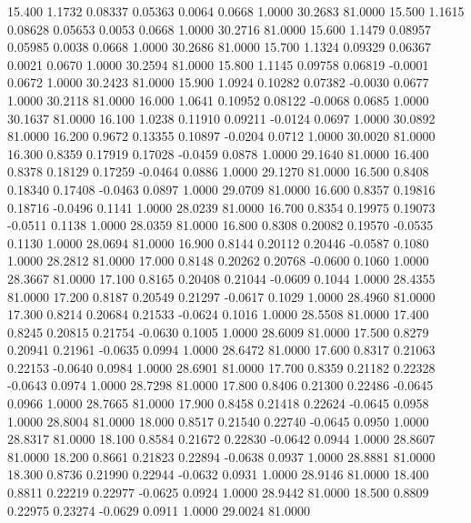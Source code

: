   15.400   1.1732   0.08337   0.05363   0.0064   0.0668   1.0000  30.2683  81.0000
  15.500   1.1615   0.08628   0.05653   0.0053   0.0668   1.0000  30.2716  81.0000
  15.600   1.1479   0.08957   0.05985   0.0038   0.0668   1.0000  30.2686  81.0000
  15.700   1.1324   0.09329   0.06367   0.0021   0.0670   1.0000  30.2594  81.0000
  15.800   1.1145   0.09758   0.06819  -0.0001   0.0672   1.0000  30.2423  81.0000
  15.900   1.0924   0.10282   0.07382  -0.0030   0.0677   1.0000  30.2118  81.0000
  16.000   1.0641   0.10952   0.08122  -0.0068   0.0685   1.0000  30.1637  81.0000
  16.100   1.0238   0.11910   0.09211  -0.0124   0.0697   1.0000  30.0892  81.0000
  16.200   0.9672   0.13355   0.10897  -0.0204   0.0712   1.0000  30.0020  81.0000
  16.300   0.8359   0.17919   0.17028  -0.0459   0.0878   1.0000  29.1640  81.0000
  16.400   0.8378   0.18129   0.17259  -0.0464   0.0886   1.0000  29.1270  81.0000
  16.500   0.8408   0.18340   0.17408  -0.0463   0.0897   1.0000  29.0709  81.0000
  16.600   0.8357   0.19816   0.18716  -0.0496   0.1141   1.0000  28.0239  81.0000
  16.700   0.8354   0.19975   0.19073  -0.0511   0.1138   1.0000  28.0359  81.0000
  16.800   0.8308   0.20082   0.19570  -0.0535   0.1130   1.0000  28.0694  81.0000
  16.900   0.8144   0.20112   0.20446  -0.0587   0.1080   1.0000  28.2812  81.0000
  17.000   0.8148   0.20262   0.20768  -0.0600   0.1060   1.0000  28.3667  81.0000
  17.100   0.8165   0.20408   0.21044  -0.0609   0.1044   1.0000  28.4355  81.0000
  17.200   0.8187   0.20549   0.21297  -0.0617   0.1029   1.0000  28.4960  81.0000
  17.300   0.8214   0.20684   0.21533  -0.0624   0.1016   1.0000  28.5508  81.0000
  17.400   0.8245   0.20815   0.21754  -0.0630   0.1005   1.0000  28.6009  81.0000
  17.500   0.8279   0.20941   0.21961  -0.0635   0.0994   1.0000  28.6472  81.0000
  17.600   0.8317   0.21063   0.22153  -0.0640   0.0984   1.0000  28.6901  81.0000
  17.700   0.8359   0.21182   0.22328  -0.0643   0.0974   1.0000  28.7298  81.0000
  17.800   0.8406   0.21300   0.22486  -0.0645   0.0966   1.0000  28.7665  81.0000
  17.900   0.8458   0.21418   0.22624  -0.0645   0.0958   1.0000  28.8004  81.0000
  18.000   0.8517   0.21540   0.22740  -0.0645   0.0950   1.0000  28.8317  81.0000
  18.100   0.8584   0.21672   0.22830  -0.0642   0.0944   1.0000  28.8607  81.0000
  18.200   0.8661   0.21823   0.22894  -0.0638   0.0937   1.0000  28.8881  81.0000
  18.300   0.8736   0.21990   0.22944  -0.0632   0.0931   1.0000  28.9146  81.0000
  18.400   0.8811   0.22219   0.22977  -0.0625   0.0924   1.0000  28.9442  81.0000
  18.500   0.8809   0.22975   0.23274  -0.0629   0.0911   1.0000  29.0024  81.0000
